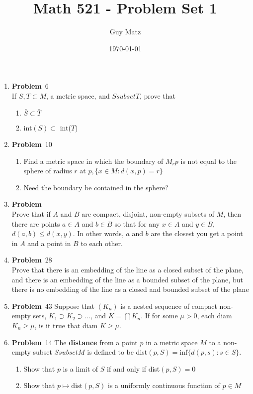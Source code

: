 \documentclass[12pt]{amsart}
\title{\textbf{Math 521 - Problem Set 1}}
\author{Guy Matz}
\date{\today}
\newcommand{\benu}{\begin{enumerate}}
\newcommand{\eenu}{\end{enumerate}}
\theoremstyle{definition}
\newcommand{\itep}{\item {\bfseries Problem}\ }
\begin{document}
 

\maketitle

\begin{enumerate}[series=p]
\itep 6\\
If $S, T \subset M$, a metric space, and $S subset T$, prove that
	\benu
	\item $\bar{S} \subset \bar{T}$
	\item int$(S) \subset$ int($T$) 
	\eenu
\newpage

\itep 10\\
\benu
	\item Find a metric space in which the boundary of $M_rp$ is not equal to the sphere of radius $r$ at $p, \{x \in M : d(x,p) = r\}$
	\item Need the boundary be contained in the sphere?
\eenu

\newpage

\itep \\
Prove that if $A$ and $B$ are compact, disjoint, non-empty subsets of $M$, then there are points $a\in A$ and $b\in B$ so that for any $x\in A$ and $y\in B$, $d(a,b)\leq d(x,y)$. In other words, $a$ and $b$ are the closest you get a point in $A$ and a point in $B$ to each other.

\newpage

\itep 28\\
Prove that there is an embedding of the line as a closed subset of the plane, and there is an embedding of the line as a bounded subset of the plane, but there is no embedding of the line as a closed and bounded subset of the plane

\newpage

\itep 43 
Suppose that $(K_n)$ is a nested sequence of compact non-empty sets, $K_1 \supset K_2 \supset \dots $, and $K = \bigcap K_n$.  If for some $\mu > 0$, each diam$K_n \geq \mu$, is it true that diam $K \geq \mu$.
\newpage

\itep 14
The \textbf{distance} from a point $p$ in a metric space $M$ to a non-empty subset $S subset M$ is defined to be dist$(p, S) = \text{inf}\{d(p,s): s \in S\}$.
	\benu
		\item Show that $p$ is a limit of $S$ if and only if dist$(p,S) = 0$
		\item Show that $p \mapsto \text{dist}(p, S)$ is a uniformly continuous function of $p \in M$
	\eenu
\newpage


\end{enumerate}
\end{document}
